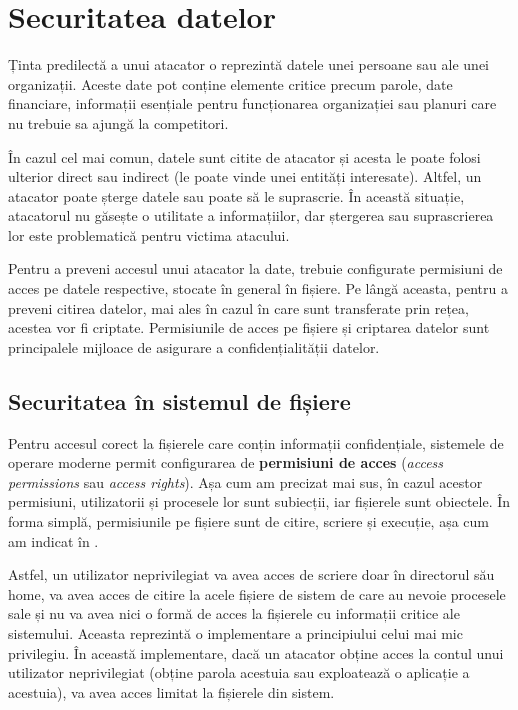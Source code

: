 \section{Securitatea datelor}
\label{sec:sec:data}

Ținta predilectă a unui atacator o reprezintă datele unei persoane sau ale unei organizații. Aceste date pot conține elemente critice precum parole, date financiare, informații esențiale pentru funcționarea organizației sau planuri care nu trebuie sa ajungă la competitori.

În cazul cel mai comun, datele sunt citite de atacator și acesta le poate folosi ulterior direct sau indirect (le poate vinde unei entități interesate). Altfel, un atacator poate șterge datele sau poate să le suprascrie. În această situație, atacatorul nu găsește o utilitate a informațiilor, dar ștergerea sau suprascrierea lor este problematică pentru victima atacului.

Pentru a preveni accesul unui atacator la date, trebuie configurate permisiuni de acces pe datele respective, stocate în general în fișiere. Pe lângă aceasta, pentru a preveni citirea datelor, mai ales în cazul în care sunt transferate prin rețea, acestea vor fi criptate. Permisiunile de acces pe fișiere și criptarea datelor sunt principalele mijloace de asigurare a confidențialității datelor.

\subsection{Securitatea în sistemul de fișiere}
\label{sec:sec:data:fs}

Pentru accesul corect la fișierele care conțin informații confidențiale, sistemele de operare moderne permit configurarea de \textbf{permisiuni de acces} (\textit{access permissions} sau \textit{access rights}). Așa cum am precizat mai sus, în cazul acestor permisiuni, utilizatorii și procesele lor sunt subiecții, iar fișierele sunt obiectele. În forma simplă, permisiunile pe fișiere sunt de citire, scriere și execuție, așa cum am indicat în .

Astfel, un utilizator neprivilegiat va avea acces de scriere doar în directorul său home, va avea acces de citire la acele fișiere de sistem de care au nevoie procesele sale și nu va avea nici o formă de acces la fișierele cu informații critice ale sistemului. Aceasta reprezintă o implementare a principiului celui mai mic privilegiu. În această implementare, dacă un atacator obține acces la contul unui utilizator neprivilegiat (obține parola acestuia sau exploatează o aplicație a acestuia), va avea acces limitat la fișierele din sistem.

